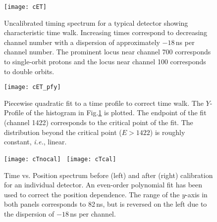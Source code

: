 \begin{figure}[hb]
\centering
\texttt{[image: cET]}%
\caption[Uncalibrated time spectrum for a typical detector showing time walk]{Uncalibrated timing spectrum for a typical detector showing characteristic time walk.  Increasing times correspond to decreasing channel number with a dispersion of approximately $-18$\,ns per channel number.  The prominent locus near channel 700 corresponds to single-orbit protons and the locus near channel 100 corresponds to double orbits.}%
\label{time_plot}%
\end{figure}

\begin{figure}[p]
\centering
\texttt{[image: cET\_pfy]}
\caption[Piecewise quadratic fit to a time profile to correct time walk]{Piecewise quadratic fit to a time profile to correct time walk.  The $Y$-Profile of the histogram in Fig.\ref{time_plot} is plotted.  The endpoint of the fit (channel 1422) corresponds to the critical point of the fit.  The distribution beyond the critical point ($E>1422$) is roughly constant, \textit{i.e.}, linear.}%
\label{time_fit}%
\end{figure}

\begin{figure}[p]
\centering
\texttt{[image: cTnocal]}~
\texttt{[image: cTcal]}\\
\caption[Time vs. position spectrum before (left) and after (right) calibration]{Time vs. Position spectrum before (left) and after (right) calibration for an individual detector.  An even-order polynomial fit has been used to correct the position dependence.  The range of the $y$-axis in both panels corresponds to 82\,ns, but is reversed on the left due to the dispersion of $-18$\,ns per channel.}%
\label{time_cal}%
\end{figure}
